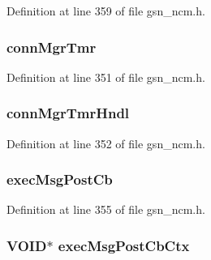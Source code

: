 Definition at line 359 of file gsn\_\-ncm.h.

\hypertarget{a00158_a5d664c13d9e783d00d5cfc011cd1b61f}{
\subsubsection[{connMgrTmr}]{ {\bf connMgrTmr}}}
\label{a00158_a5d664c13d9e783d00d5cfc011cd1b61f}


Definition at line 351 of file gsn\_\-ncm.h.

\hypertarget{a00158_a5c4fd3c07583992a7b7b769bb0e1a950}{
\subsubsection[{connMgrTmrHndl}]{ {\bf connMgrTmrHndl}}}
\label{a00158_a5c4fd3c07583992a7b7b769bb0e1a950}


Definition at line 352 of file gsn\_\-ncm.h.

\hypertarget{a00158_a5603e3f15c0a3cf1d8b11f8d09853a34}{
\subsubsection[{execMsgPostCb}]{ {\bf execMsgPostCb}}}
\label{a00158_a5603e3f15c0a3cf1d8b11f8d09853a34}


Definition at line 355 of file gsn\_\-ncm.h.

\hypertarget{a00158_aa13ea63dd76c4df311eda6a811d384f5}{
\subsubsection[{execMsgPostCbCtx}]{\setlength{\rightskip}{0pt plus 5cm}VOID$\ast$ {\bf execMsgPostCbCtx}}}
\label{a00158_aa13ea63dd76c4df311eda6a811d384f5}


